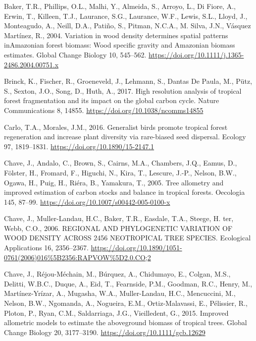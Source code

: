 \documentclass[
  12pt,
]{article}
\newlength{\cslhangindent}
\newlength{\cslentryspacingunit} %
\newenvironment{CSLReferences}[2] %
 {%
  \setlength{\parindent}{0pt}
  \ifodd #1
  \let\oldpar\par
  \def\par{\hangindent=\cslhangindent\oldpar}
  \fi
  \setlength{\parskip}{#2\cslentryspacingunit}
 }%
 {}
\begin{document}
\begin{CSLReferences}{1}{0}
\leavevmode{}%
Baker, T.R., Phillips, O.L., Malhi, Y., Almeida, S., Arroyo, L., Di Fiore, A., Erwin, T., Killeen, T.J., Laurance, S.G., Laurance, W.F., Lewis, S.L., Lloyd, J., Monteagudo, A., Neill, D.A., Patiño, S., Pitman, N.C.A., M. Silva, J.N., Vásquez Martínez, R., 2004. Variation in wood density determines spatial patterns {inAmazonian} forest biomass: {Wood} specific gravity and {Amazonian} biomass estimates. Global Change Biology 10, 545--562. \url{https://doi.org/10.1111/j.1365-2486.2004.00751.x}

\leavevmode{}%
Brinck, K., Fischer, R., Groeneveld, J., Lehmann, S., Dantas De Paula, M., Pütz, S., Sexton, J.O., Song, D., Huth, A., 2017. High resolution analysis of tropical forest fragmentation and its impact on the global carbon cycle. Nature Communications 8, 14855. \url{https://doi.org/10.1038/ncomms14855}

\leavevmode{}%
Carlo, T.A., Morales, J.M., 2016. Generalist birds promote tropical forest regeneration and increase plant diversity via rare-biased seed dispersal. Ecology 97, 1819--1831. \url{https://doi.org/10.1890/15-2147.1}

\leavevmode{}%
Chave, J., Andalo, C., Brown, S., Cairns, M.A., Chambers, J.Q., Eamus, D., Fölster, H., Fromard, F., Higuchi, N., Kira, T., Lescure, J.-P., Nelson, B.W., Ogawa, H., Puig, H., Riéra, B., Yamakura, T., 2005. Tree allometry and improved estimation of carbon stocks and balance in tropical forests. Oecologia 145, 87--99. \url{https://doi.org/10.1007/s00442-005-0100-x}

\leavevmode{}%
Chave, J., Muller-Landau, H.C., Baker, T.R., Easdale, T.A., Steege, H. ter, Webb, C.O., 2006. {REGIONAL AND PHYLOGENETIC VARIATION OF WOOD DENSITY ACROSS} 2456 {NEOTROPICAL TREE SPECIES}. Ecological Applications 16, 2356--2367. \url{https://doi.org/10.1890/1051-0761(2006)016\%5B2356:RAPVOW\%5D2.0.CO;2}

\leavevmode{}%
Chave, J., Réjou-Méchain, M., Búrquez, A., Chidumayo, E., Colgan, M.S., Delitti, W.B.C., Duque, A., Eid, T., Fearnside, P.M., Goodman, R.C., Henry, M., Martínez-Yrízar, A., Mugasha, W.A., Muller-Landau, H.C., Mencuccini, M., Nelson, B.W., Ngomanda, A., Nogueira, E.M., Ortiz-Malavassi, E., Pélissier, R., Ploton, P., Ryan, C.M., Saldarriaga, J.G., Vieilledent, G., 2015. Improved allometric models to estimate the aboveground biomass of tropical trees. Global Change Biology 20, 3177--3190. \url{https://doi.org/10.1111/gcb.12629}


\end{CSLReferences}
\end{document}

